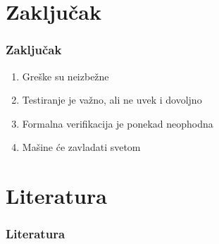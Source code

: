 \documentclass{beamer}
\begin{document}
\section{Zaključak}
\begin{frame}
\frametitle{Zaključak}
\begin{enumerate}
\item Greške su neizbežne
\item Testiranje je važno, ali ne uvek i dovoljno
\item Formalna verifikacija je ponekad neophodna
\item Mašine će zavladati svetom
\end{enumerate}
\end{frame}

\section{Literatura}
\begin{frame}

\nocite{quinn_ethics}
\nocite{laski2009software}
\nocite{pham_reliability}
\nocite{Bayou}

\frametitle{Literatura}


\end{frame}
\end{document}

